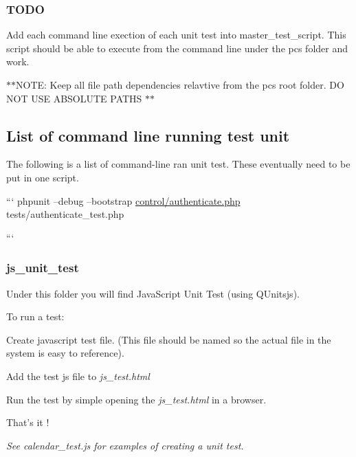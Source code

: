 \subsubsection*{T\-O\-D\-O}

Add each command line exection of each unit test into master\-\_\-test\-\_\-script. This script should be able to execute from the command line under the pcs folder and work.

$\ast$$\ast$\-N\-O\-T\-E\-: Keep all file path dependencies relavtive from the pcs root folder. D\-O N\-O\-T U\-S\-E A\-B\-S\-O\-L\-U\-T\-E P\-A\-T\-H\-S $\ast$$\ast$

\subsection*{List of command line running test unit}

The following is a list of command-\/line ran unit test. These eventually need to be put in one script.

``` phpunit --debug --bootstrap \hyperlink{authenticate_8php}{control/authenticate.\-php} tests/authenticate\-\_\-test.\-php

``` 



\subsubsection*{js\-\_\-unit\-\_\-test}

Under this folder you will find Java\-Script Unit Test (using Q\-Unitsjs).

To run a test\-:


\begin{DoxyEnumerate}
\item Create javascript test file. (This file should be named so the actual file in the system is easy to reference).
\item Add the test js file to {\itshape js\-\_\-test.\-html}
\item Run the test by simple opening the {\itshape js\-\_\-test.\-html} in a browser.
\end{DoxyEnumerate}

That's it !

{\itshape See calendar\-\_\-test.\-js for examples of creating a unit test.} 